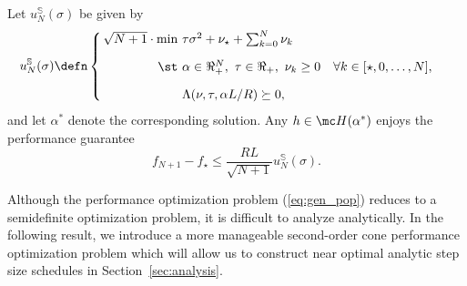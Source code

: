 \documentclass{article}
\begin{document}
\begin{corollary}\label{cor:u-S-bound}
    Let $u_N^{\mathbb S}(\sigma)$ be given by
    \begin{align}
  \label{eq:gen_pop}
  u^{\mathbb S}_N(\sigma) \defn &  \left\{\!\!
          \begin{array}{r@{~}l}
            \sqrt{N+1}\cdot \min & \tau \sigma^2 + \nu_\star + \sum_{k=0}^{N} \nu_k \\[1em]
            \st & \alpha\in \Re_+^{N}, ~\tau\in \Re_+, ~\nu_k\geq 0 \quad \forall k \in [\star, 0, \dots, N], \\[1em]
                 &  \Lambda(\nu, \tau, \alpha L/R) \succeq 0,
           \end{array}\right.
\end{align}
and let $\alpha^*$ denote the corresponding solution. Any $h\in\mc H(\alpha^*)$ enjoys the performance guarantee
\[
f_{N+1}-f_\star\le \frac{RL}{\sqrt{N+1}}u^{\mathbb S}_N(\sigma).
\]
\end{corollary}

Although the performance optimization problem (\ref{eq:gen_pop}) reduces to a semidefinite optimization problem, it is difficult to analyze analytically. In the following result, we introduce a more manageable second-order cone performance optimization problem which will allow us to construct near optimal analytic step size schedules in Section~\ref{sec:analysis}. 
\end{document}

